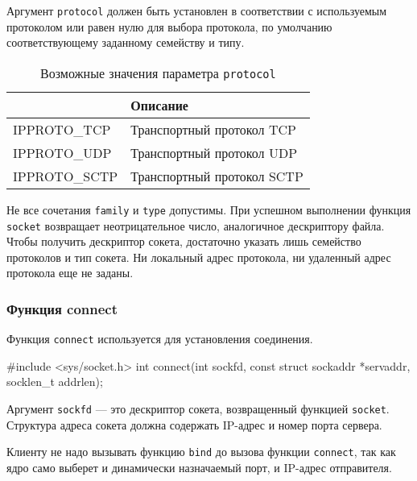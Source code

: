  Аргумент \lstinline{protocol} должен быть установлен в соответствии с используемым протоколом или равен нулю для выбора протокола, по умолчанию соответствующему заданному семейству и типу.
\begin{table}[h!]
  \caption{Возможные значения параметра \lstinline{protocol}}
  \begin{center}
    \begin{tabular}{p{3cm}l}
      \toprule
      & \textbf{Описание} \\
      \midrule
      IPPROTO\_TCP & Транспортный протокол TCP \\
      IPPROTO\_UDP & Транспортный протокол UDP \\
      IPPROTO\_SCTP & Транспортный протокол SCTP \\
      \bottomrule
    \end{tabular}
  \end{center}
\end{table}

Не все сочетания \lstinline{family} и \lstinline{type} допустимы. При успешном выполнении функция \lstinline{socket} возвращает неотрицательное число, аналогичное дескриптору файла. Чтобы получить дескриптор сокета, достаточно указать лишь семейство протоколов и тип сокета. Ни локальный адрес протокола, ни удаленный адрес протокола еще не заданы.

\subsubsection{Функция connect}
Функция \lstinline{connect} используется для установления соединения.
\begin{clst}{}{}
#include <sys/socket.h>
int connect(int sockfd, const struct sockaddr *servaddr, socklen_t addrlen);
\end{clst}

Аргумент \lstinline{sockfd} --- это дескриптор сокета, возвращенный функцией \lstinline{socket}. Структура адреса сокета должна содержать IP-адрес и номер порта сервера.

Клиенту не надо вызывать функцию \lstinline{bind} до вызова функции \lstinline{connect}, так как ядро само выберет и динамически назначаемый порт, и IP-адрес отправителя.

